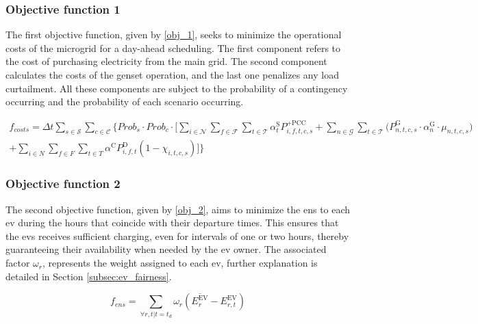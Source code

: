 \documentclass[preprint, 12pt, 3p]{elsarticle}
\begin{document}
\subsubsection{Objective function 1}

The first objective function, given by \eqref{obj_1}, seeks to minimize the 
operational costs of the microgrid for a day-ahead scheduling. 
The first component refers to the cost of purchasing electricity 
from the main grid. The second component calculates the costs of the \gls{genset} 
operation, and the last one penalizes any load curtailment. All these
components are subject to the probability of a contingency occurring and the probability of each scenario occurring. 

\vspace{-15pt}
\begin{multline}\label{obj_1}
{f_{costs}} = \Delta t \sum_{s \in \mathcal{S}} \sum_{c \in \mathcal{C}}
    \Biggl\{ \mathit{Prob}_{s} \cdot \mathit{Prob}_{c} \cdot \Bigg[
        \sum_{i \in \mathcal{N}} 
        \sum_{f \in \mathcal{F}} 
        \sum_{t \in \mathcal{T}}  
\alpha_{t}^{\text{S}} P_{i,f,t,c,s}^{+\text{PCC}}  %
    + \sum_{n \in \mathcal{G}} 
    \sum_{t \in \mathcal{T}} 
\Big(P^{\text{G}}_{n,t,c,s} \cdot \alpha_{n}^{\text{G}} \cdot \mu_{n,t,c,s} \Big)  \\
    + \sum_{i \in \mathit{N}} 
    \sum_{f \in \mathit{F}}
    \sum_{t \in \mathit{T}}
   \alpha^{\text{C}} P_{i,f,t}^{\text{D}} 
        (1 - \chi_{i,t,c,s}) \Bigg] \Biggr\} 
\end{multline}
\vspace{-12pt}

\subsubsection{Objective function 2}

The second objective function, given by \eqref{obj_2}, aims to minimize the 
\gls{ens} to each \gls{ev} during the hours that coincide with their 
departure times.  This ensures that the \glspl{ev} receives sufficient charging, 
even for intervals of one or two hours, thereby guaranteeing their 
availability when needed by the \gls{ev} owner. The associated factor
$\omega_{r}$, represents the weight assigned to each \gls{ev}, further 
explanation is detailed in Section \ref{subsec:ev_fairness}.

\begin{equation}\label{obj_2}
{f_{ens}} = \sum_{\forall r,t | t=t_{d}} 
    \omega_{r} \left( \overline{{E}_{r}^{\mathrm{EV}}} - {E}_{r,t}^{\mathrm{EV}} \right)
\end{equation}
\end{document}
